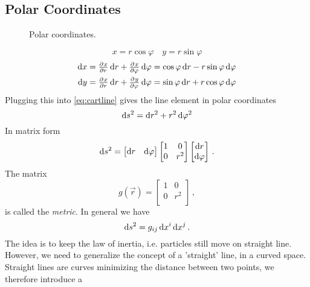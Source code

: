 \subsection*{Polar Coordinates}
\begin{figure}[htb]
    \begin{center}
    \end{center}
    \caption{Polar coordinates.}
\end{figure}
\begin{equation}
    x= r\cos\varphi\quad y= r\sin\varphi
\end{equation}
\begin{align}
    \dif x&= \pd{x}{r}\dif r+\pd{x}{\varphi}\dif \varphi = \cos\varphi\dif r-r\sin\varphi\dif \varphi\\
    \dif y&= \pd{x}{r}\dif r+\pd{y}{\varphi}\dif \varphi = \sin\varphi\dif r+r\cos\varphi\dif \varphi
\end{align}
Plugging this into \eqref{eq:cartline} gives the line element in polar coordinates
\begin{equation}
    \dif s^2=\dif r^2+r^2\dif \varphi^2
\end{equation}
In matrix form
\begin{equation}
    \dif s^2=
    \begin{bmatrix}
        \dif r& \dif \varphi
    \end{bmatrix}
    \begin{bmatrix}
        1& 0\\
        0& r^2\\
    \end{bmatrix}
    \begin{bmatrix}
        \dif r\\ \dif \varphi
    \end{bmatrix}\, .
\end{equation}
The matrix
\begin{equation}
    g(\vec{r})=
    \begin{bmatrix}
        1& 0\\
        0& r^2\\
    \end{bmatrix}\, ,
\end{equation}
is called the \emph{metric}.
In general we have
\begin{equation}
    \dif s^2 = g_{ij}\dif x^i\dif x^j\, .
\end{equation}
The idea is to keep the law of inertia, i.e. particles still move on straight
line. However, we need to generalize the concept of a 'straight' line, in a
curved space.
Straight lines are curves minimizing the distance between two points, we therefore introduce a
